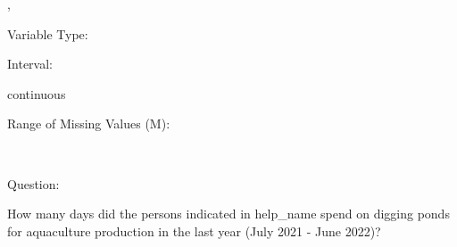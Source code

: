 \documentclass[
]{article}
\begin{document}
,

\begin{minipage}[t]{0.3\linewidth}

\colorbox{mypink1}{}

\end{minipage}%
\begin{minipage}[t]{0.7\linewidth}

\colorbox{mypink1}{\makebox[\textwidth]{\strut\bfseries\color{black}  
 }}

\end{minipage}

\begin{minipage}[t]{0.3\linewidth}

Variable Type:

\end{minipage}%
\begin{minipage}[t]{0.7\linewidth}

\end{minipage}

\begin{minipage}[t]{0.3\linewidth}

Interval:

\end{minipage}%
\begin{minipage}[t]{0.7\linewidth}

continuous

\end{minipage}

\begin{minipage}[t]{0.3\linewidth}

Range of Missing Values (M):

\end{minipage}%
\begin{minipage}[t]{0.7\linewidth}

~

\end{minipage}

\begin{minipage}[t]{0.3\linewidth}

Question:

\end{minipage}%
\begin{minipage}[t]{0.7\linewidth}

How many days did the persons indicated in help\_name spend on digging
ponds for aquaculture production in the last year (July 2021 - June
2022)?

\end{minipage}
\end{document}
